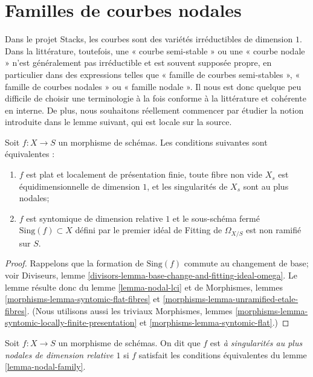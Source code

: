 \section{Familles de courbes nodales}
\label{section-families-nodal}

\noindent
Dans le projet Stacks, les courbes sont des variétés irréductibles de dimension $1$. Dans la littérature, toutefois, une « courbe semi-stable » ou une « courbe nodale » n'est généralement pas irréductible et est souvent supposée propre, en particulier dans des expressions telles que « famille de courbes semi-stables », « famille de courbes nodales » ou « famille nodale ». Il nous est donc quelque peu difficile de choisir une terminologie à la fois conforme à la littérature et cohérente en interne. De plus, nous souhaitons réellement commencer par étudier la notion introduite dans le lemme suivant, qui est locale sur la source.

\begin{lemma}
\label{lemma-nodal-family}
Soit $f : X \to S$ un morphisme de schémas. Les conditions suivantes sont équivalentes : \begin{enumerate} \item $f$ est plat et localement de présentation finie, toute fibre non vide $X_s$ est équidimensionnelle de dimension $1$, et les singularités de $X_s$ sont au plus nodales; \item $f$ est syntomique de dimension relative $1$ et le sous-schéma fermé $\text{Sing}(f) \subset X$ défini par le premier idéal de Fitting de $\Omega_{X/S}$ est non ramifié sur $S$.
\end{enumerate}
\end{lemma}

\begin{proof}
Rappelons que la formation de $\text{Sing}(f)$ commute au changement de base; voir Diviseurs, lemme \ref{divisors-lemma-base-change-and-fitting-ideal-omega}. Le lemme résulte donc du lemme \ref{lemma-nodal-lci} et de Morphismes, lemmes \ref{morphisms-lemma-syntomic-flat-fibres} et \ref{morphisms-lemma-unramified-etale-fibres}. (Nous utilisons aussi les triviaux Morphismes, lemmes \ref{morphisms-lemma-syntomic-locally-finite-presentation} et \ref{morphisms-lemma-syntomic-flat}.)
\end{proof}

\begin{definition}
\label{definition-nodal-family}
Soit $f : X \to S$ un morphisme de schémas. On dit que $f$ est {\it à singularités au plus nodales de dimension relative $1$} si $f$ satisfait les conditions équivalentes du lemme \ref{lemma-nodal-family}.
\end{definition}

